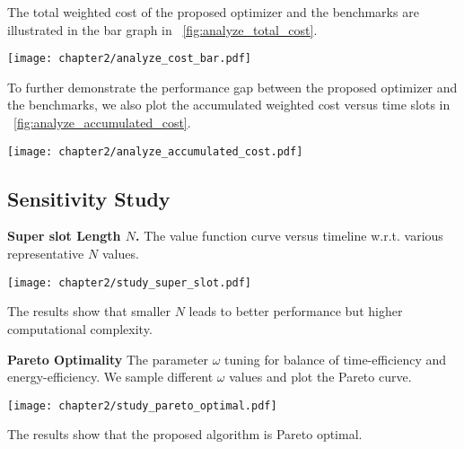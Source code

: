 The total weighted cost of the proposed {\fwName} optimizer and the benchmarks are illustrated in the bar graph in \figurename~\ref{fig:analyze_total_cost}.
\begin{figure*}
    \centering
    \texttt{[image: chapter2/analyze\_cost\_bar.pdf]}
    \caption{The total weighted cost of the proposed {\fwName} optimizer and the benchmarks.}
    \label{fig:analyze_total_cost}
\end{figure*}

%
To further demonstrate the performance gap between the proposed {\fwName} optimizer and the benchmarks, we also plot the accumulated weighted cost versus time slots in \figurename~\ref{fig:analyze_accumulated_cost}.
\begin{figure*}
    \centering
    \texttt{[image: chapter2/analyze\_accumulated\_cost.pdf]}
    \caption{The accumulated weighted cost versus time slots.}
    \label{fig:analyze_accumulated_cost}
\end{figure*}

\subsection{Sensitivity Study}
\label{subsec:chapter2-sensitivity}
\noindent\textbf{Super slot Length $N$.}
The value function curve versus timeline w.r.t. various representative $N$ values.
\begin{figure*}
    \centering
    \texttt{[image: chapter2/study\_super\_slot.pdf]}
    \caption{The total weighted cost w.r.t different super slot length $N$.}
    \label{fig:study_super_slot}
\end{figure*}
The results show that smaller $N$ leads to better performance but higher computational complexity.


\noindent\textbf{Pareto Optimality}
The parameter $\omega$ tuning for balance of time-efficiency and energy-efficiency.
We sample different $\omega$ values and plot the Pareto curve.
\begin{figure*}
    \centering
    \texttt{[image: chapter2/study\_pareto\_optimal.pdf]}
    \caption{The total weighted cost under different weight $\omega$ and different algorithms.}
    \label{fig:study_pareto_optimal}
\end{figure*}
The results show that the proposed algorithm is Pareto optimal.

